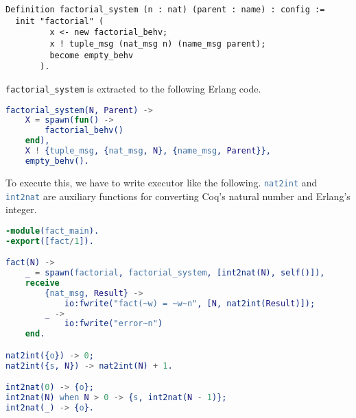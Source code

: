 \begin{lstlisting}
Definition factorial_system (n : nat) (parent : name) : config :=
  init "factorial" (
         x <- new factorial_behv;
         x ! tuple_msg (nat_msg n) (name_msg parent);
         become empty_behv
       ).
\end{lstlisting}

\lstinline|factorial_system| is extracted to the following Erlang code.

\begin{lstlisting}[language=erlang]
factorial_system(N, Parent) ->
    X = spawn(fun() ->
        factorial_behv()
    end),
    X ! {tuple_msg, {nat_msg, N}, {name_msg, Parent}},
    empty_behv().
\end{lstlisting}

To execute this, we have to write executor like the following.
\lstinline[language=erlang]|nat2int| and \lstinline[language=erlang]|int2nat| are auxiliary functions for converting Coq's natural number and Erlang's integer.

\begin{lstlisting}[language=erlang]
-module(fact_main).
-export([fact/1]).

fact(N) ->
    _ = spawn(factorial, factorial_system, [int2nat(N), self()]),
    receive
        {nat_msg, Result} ->
            io:fwrite("fact(~w) = ~w~n", [N, nat2int(Result)]);
        _ ->
            io:fwrite("error~n")
    end.

nat2int({o}) -> 0;
nat2int({s, N}) -> nat2int(N) + 1.

int2nat(0) -> {o};
int2nat(N) when N > 0 -> {s, int2nat(N - 1)};
int2nat(_) -> {o}.
\end{lstlisting}
